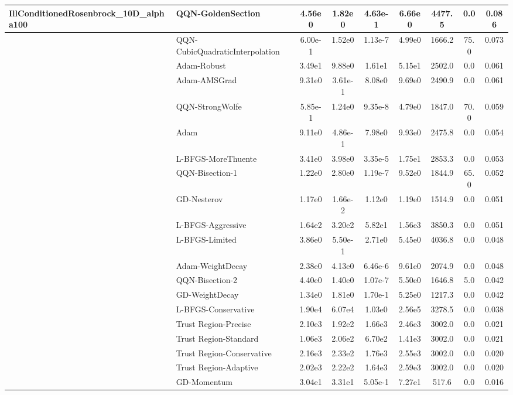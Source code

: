 \documentclass[10pt]{article}
\begin{document}
\begin{longtable}{|l|l|c|c|c|c|c|c|c|}
IllConditionedRosenbrock\_10D\_alpha100 & \textbf{QQN-GoldenSection} & 4.56e0 & 1.82e0 & 4.63e-1 & 6.66e0 & 4477.5 & 0.0 & 0.086 \\
\hline
 & QQN-CubicQuadraticInterpolation & 6.00e-1 & 1.52e0 & 1.13e-7 & 4.99e0 & 1666.2 & 75.0 & 0.073 \\
\hline
 & Adam-Robust & 3.49e1 & 9.88e0 & 1.61e1 & 5.15e1 & 2502.0 & 0.0 & 0.061 \\
\hline
 & Adam-AMSGrad & 9.31e0 & 3.61e-1 & 8.08e0 & 9.69e0 & 2490.9 & 0.0 & 0.061 \\
\hline
 & QQN-StrongWolfe & 5.85e-1 & 1.24e0 & 9.35e-8 & 4.79e0 & 1847.0 & 70.0 & 0.059 \\
\hline
 & Adam & 9.11e0 & 4.86e-1 & 7.98e0 & 9.93e0 & 2475.8 & 0.0 & 0.054 \\
\hline
 & L-BFGS-MoreThuente & 3.41e0 & 3.98e0 & 3.35e-5 & 1.75e1 & 2853.3 & 0.0 & 0.053 \\
\hline
 & QQN-Bisection-1 & 1.22e0 & 2.80e0 & 1.19e-7 & 9.52e0 & 1844.9 & 65.0 & 0.052 \\
\hline
 & GD-Nesterov & 1.17e0 & 1.66e-2 & 1.12e0 & 1.19e0 & 1514.9 & 0.0 & 0.051 \\
\hline
 & L-BFGS-Aggressive & 1.64e2 & 3.20e2 & 5.82e1 & 1.56e3 & 3850.3 & 0.0 & 0.051 \\
\hline
 & L-BFGS-Limited & 3.86e0 & 5.50e-1 & 2.71e0 & 5.45e0 & 4036.8 & 0.0 & 0.048 \\
\hline
 & Adam-WeightDecay & 2.38e0 & 4.13e0 & 6.46e-6 & 9.61e0 & 2074.9 & 0.0 & 0.048 \\
\hline
 & QQN-Bisection-2 & 4.40e0 & 1.40e0 & 1.07e-7 & 5.50e0 & 1646.8 & 5.0 & 0.042 \\
\hline
 & GD-WeightDecay & 1.34e0 & 1.81e0 & 1.70e-1 & 5.25e0 & 1217.3 & 0.0 & 0.042 \\
\hline
 & L-BFGS-Conservative & 1.90e4 & 6.07e4 & 1.03e0 & 2.56e5 & 3278.5 & 0.0 & 0.038 \\
\hline
 & Trust Region-Precise & 2.10e3 & 1.92e2 & 1.66e3 & 2.46e3 & 3002.0 & 0.0 & 0.021 \\
\hline
 & Trust Region-Standard & 1.06e3 & 2.06e2 & 6.70e2 & 1.41e3 & 3002.0 & 0.0 & 0.021 \\
\hline
 & Trust Region-Conservative & 2.16e3 & 2.33e2 & 1.76e3 & 2.55e3 & 3002.0 & 0.0 & 0.020 \\
\hline
 & Trust Region-Adaptive & 2.02e3 & 2.22e2 & 1.64e3 & 2.59e3 & 3002.0 & 0.0 & 0.020 \\
\hline
 & GD-Momentum & 3.04e1 & 3.31e1 & 5.05e-1 & 7.27e1 & 517.6 & 0.0 & 0.016 \\

\end{longtable}
\end{document}
